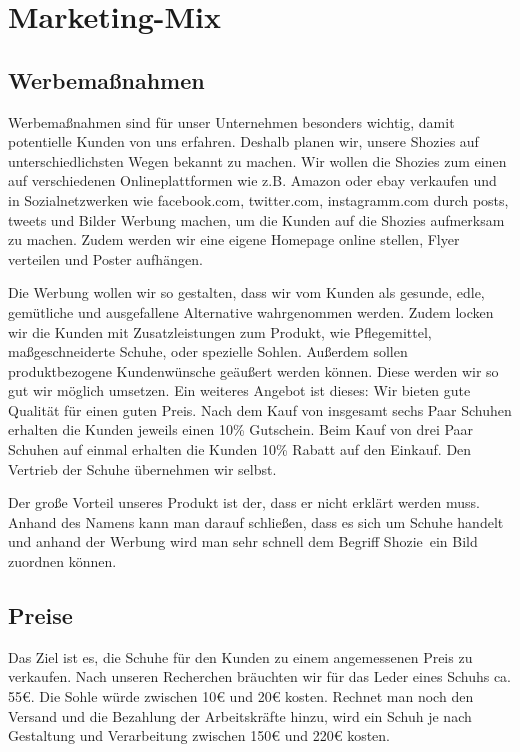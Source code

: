 \chapter{Marketing-Mix}
\label{cha:6}

\section{Werbemaßnahmen}
Werbemaßnahmen sind für unser Unternehmen besonders wichtig, damit potentielle Kunden von uns erfahren. Deshalb planen wir, unsere Shozies auf unterschiedlichsten Wegen bekannt zu machen. Wir wollen die Shozies zum einen auf verschiedenen Onlineplattformen wie z.B. Amazon oder ebay verkaufen und in Sozialnetzwerken wie facebook.com, twitter.com, instagramm.com durch posts, tweets und Bilder Werbung machen, um die Kunden auf die Shozies aufmerksam zu machen. Zudem werden wir eine eigene Homepage online stellen, Flyer verteilen und Poster aufhängen. 

Die Werbung wollen wir so gestalten, dass wir vom Kunden als gesunde, edle, gemütliche und ausgefallene Alternative wahrgenommen werden. Zudem locken wir die Kunden mit Zusatzleistungen zum Produkt, wie Pflegemittel, maßgeschneiderte Schuhe, oder spezielle Sohlen. Außerdem sollen produktbezogene Kundenwünsche geäußert werden können. Diese werden wir so gut wir möglich umsetzen. Ein weiteres Angebot ist dieses: Wir bieten gute Qualität für einen guten Preis. Nach dem Kauf von insgesamt sechs Paar Schuhen erhalten die Kunden jeweils einen 10\% Gutschein. Beim Kauf von drei Paar Schuhen auf einmal erhalten die Kunden 10\% Rabatt auf den Einkauf. Den Vertrieb der Schuhe übernehmen wir selbst.

Der große Vorteil unseres Produkt ist der, dass er nicht erklärt werden muss. Anhand des Namens kann man darauf schließen, dass es sich um Schuhe handelt und anhand der Werbung wird man sehr schnell dem Begriff \glqq Shozie\grqq\ ein Bild zuordnen können. 

\section{Preise}
Das Ziel ist es, die Schuhe für den Kunden zu einem angemessenen Preis zu verkaufen. Nach unseren Recherchen bräuchten wir für das Leder eines Schuhs ca. 55€. Die Sohle würde zwischen 10€ und 20€ kosten. Rechnet man noch den Versand und die Bezahlung der Arbeitskräfte hinzu, wird ein Schuh je nach Gestaltung und Verarbeitung zwischen 150€ und 220€ kosten.
